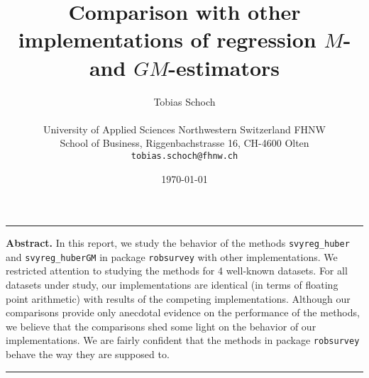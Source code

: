 \documentclass[a4paper,oneside,11pt,DIV=12]{scrartcl}
\newcommand{\code}[1]{{\texttt{#1}}}
\begin{document}

\title{Comparison with other implementations of
    regression $M$- and $GM$-estimators}

\author{{\normalsize Tobias Schoch} \\
\begin{minipage}[t][][t]{\textwidth}
	\begin{center}
	\small{University of Applied Sciences Northwestern Switzerland FHNW} \\
	\small{School of Business, Riggenbachstrasse 16, CH-4600 Olten} \\
	\small{\texttt{tobias.schoch{@}fhnw.ch}}
	\end{center}
\end{minipage}}

\date{{\small \today}}
\maketitle

\renewenvironment{abstract}{%
\begin{center}\begin{minipage}{0.9\textwidth}
\rule{\textwidth}{0.4pt}
{\sffamily\bfseries\footnotesize Abstract.}\small}
{\par\noindent\rule{\textwidth}{0.4pt}\end{minipage}\end{center}}

\begin{abstract}
In this report, we study the behavior of the methods \code{svyreg\_huber}
and \code{svyreg\_huberGM} in package \code{robsurvey} with other
implementations. We restricted attention to studying the methods for
4 well-known datasets. For all datasets under study, our implementations
are identical (in terms of floating point arithmetic) with results of
the competing implementations. Although our comparisons provide only
anecdotal evidence on the performance of the methods, we believe
that the comparisons shed some light on the behavior of our
implementations. We are fairly confident that the methods in package
\code{robsurvey} behave the way they are supposed to.
\end{abstract}

\vspace{1em}



\end{document}
